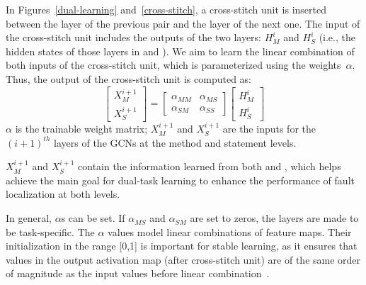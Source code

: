 In Figures~\ref{dual-learning} and~\ref{cross-stitch}, a cross-stitch
unit is inserted between the  layer of the previous pair
and the  layer of the next one. The input of the
cross-stitch unit includes the outputs of the two  layers:
$H_M^i$ and $H_S^i$ (i.e., the hidden states of those layers in
 and ). We aim to learn the linear
combination of both inputs of the cross-stitch unit, which is
parameterized using the weights~$\alpha$.
%
Thus, the output of the cross-stitch unit is computed as:
\begin{equation}\label{cross-stitch-formula}
	\begin{bmatrix}
		X_M^{i+1}\\
		X_S^{i+1}
	\end{bmatrix}
        =
        \begin{bmatrix}
		\alpha_{MM} &  \alpha_{MS} \\
		\alpha_{SM} &  \alpha_{SS}
	\end{bmatrix}
	\begin{bmatrix}
		H_M^{i}\\
		H_S^{i}
	\end{bmatrix}
\end{equation}
$\alpha$ is the trainable weight matrix; $X_M^{i+1}$ and
$X_S^{i+1}$ are the inputs for the $(i+1)^{th}$ layers of the GCNs at the
method and statement levels.

$X_M^{i+1}$ and $X_S^{i+1}$ contain the information learned from both
 and , which helps achieve the main goal for
dual-task learning to enhance the performance of fault localization at both
levels.

In general, $\alpha$s can be set. If $\alpha_{MS}$ and $\alpha_{SM}$
are set to zeros, the layers are made to be task-specific.  The
$\alpha$ values model linear combinations of feature maps. Their
initialization in the range [0,1] is important for stable learning, as
it ensures that values in the output activation map (after
cross-stitch unit) are of the same order of magnitude as the input
values before linear combination~\cite{misra2016cross}.





